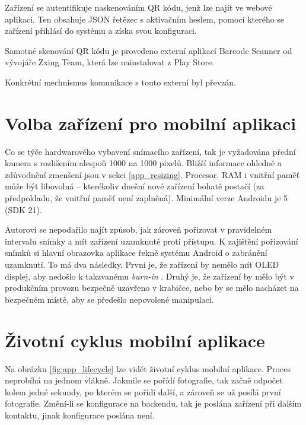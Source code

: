 \noindent
Zařízení se autentifikuje naskenováním QR kódu, jenž lze najít ve webové aplikaci. Ten obsahuje
JSON řetězec s aktivačním heslem, pomocí kterého se zařízení přihlásí do systému a získa svou konfiguraci.

Samotné skenování QR kódu je provedeno externí aplikací Barcode Scanner od vývojáře
Zxing Team, která lze nainstalovat z Play Store.

Konkrétní mechnismus komunikace s touto externí byl převzán. \citep[viz][]{QrScan}

\section{Volba zařízení pro mobilní aplikaci}

\noindent
Co se týče hardwarového vybavení snímacího zařízení, tak je vyžadována přední kamera
s rozlišením alespoň 1000 na 1000 pixelů. Bližší informace ohledně a zdůvodnění zmenšení jsou v sekci \ref{app_resizing}.
Procesor, RAM i vnitřní paměť může být libovolná -- kterékoliv
dnešní nové zařízení bohatě postačí (za předpokladu, že vnitřní paměť není zaplněná).
Minimální verze Androidu je 5 (SDK 21).

Autorovi se nepodařilo najít způsob, jak zároveň pořizovat v pravidelném intervalu snímky
a mít zařízení uzamknuté proti přístupu. K zajištění pořizování snímků si hlavní
obrazovka aplikace řekně systému Android o zabránění uzamknutí.
To má dva následky. První je, že zařízení by nemělo mít OLED displej, aby nedošlo k takzvanému
\textit{burn-in} \citep[viz][]{OledBurnIn}. Druhý je, že zařízení by mělo být v produkčním provozu
bezpečně uzavřeno v krabičce, nebo by se mělo nacházet na bezpečném místě, aby se předešlo
nepovolené manipulaci.

\section{Životní cyklus mobilní aplikace}

\noindent
Na obrázku \ref{fig:app_lifecycle} lze vidět životní cyklus mobilní aplikace.
Proces neprobíhá na jednom vlákně. Jakmile se pořídí fotografie, tak začně odpočet kolem jedné
sekundy, po kterém se pořídí další, a zároveň se už posílá první fotografie.
Změní-li se konfigurace na backendu, tak je poslána zařízení při dalším kontaktu, jinak
konfigurace poslána není.

